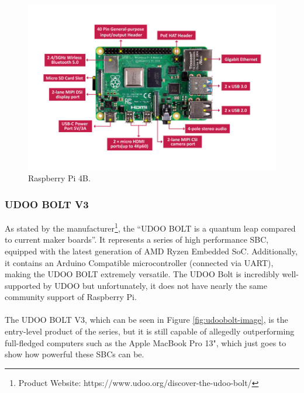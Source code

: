 \begin{figure}[H]
    \centering
    \includegraphics[width=\linewidth]{images/raspberry-4-modele-b-4go.jpg}
    \caption{Raspberry Pi 4B.}
    \label{fig:raspberrypi-image}
\end{figure}

\subsubsection{UDOO BOLT V3}

As stated by the manufacturer\footnote{Product Website: https://www.udoo.org/discover-the-udoo-bolt/}, the ``UDOO BOLT is a quantum leap compared to current maker boards''. It represents a series of high performance \acs{SBC}, equipped with the latest generation of AMD Ryzen Embedded SoC. Additionally, it contains an Arduino Compatible microcontroller (connected via UART), making the UDOO BOLT extremely versatile.
The UDOO Bolt is incredibly well-supported by UDOO but unfortunately, it does not have nearly the same community support of Raspberry Pi.

\paragraph{} The UDOO BOLT V3, which can be seen in Figure \ref{fig:udoobolt-image}, is the entry-level product of the series, but it is still capable of allegedly outperforming full-fledged computers such as the Apple MacBook Pro 13", which just goes to show how powerful these \acs{SBC}s can be.


